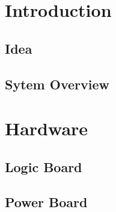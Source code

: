 \documentclass{report}
\begin{document}



\pagestyle{fancy}

\tableofcontents
\listoffigures
\newpage
\listoftables

\newpage
\setcounter{roman}{\value{page}}
\setcounter{page}{1}

\chapter{Introduction}
\label{chap:intro}
\section{Idea}
\label{sec:idea}

\section{Sytem Overview}
\label{sec:system}


\chapter{Hardware}
\label{chap:hardware}
\section{Logic Board}
\label{sec:logic}

\section{Power Board}
\label{sec:power}


\end{document}
